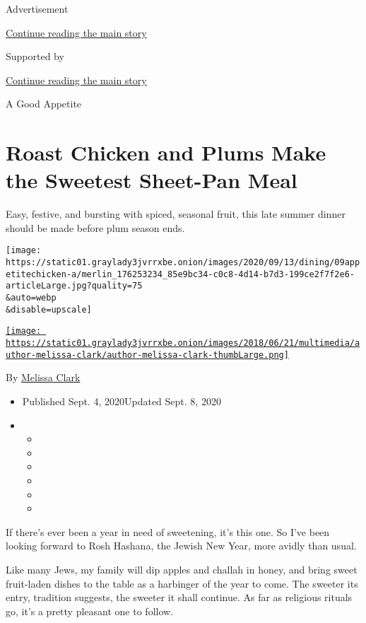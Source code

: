 Advertisement

\protect\hyperlink{after-top}{Continue reading the main story}

Supported by

\protect\hyperlink{after-sponsor}{Continue reading the main story}

A Good Appetite

\hypertarget{roast-chicken-and-plums-make-the-sweetest-sheet-pan-meal}{%
\section{Roast Chicken and Plums Make the Sweetest Sheet-Pan
Meal}\label{roast-chicken-and-plums-make-the-sweetest-sheet-pan-meal}}

Easy, festive, and bursting with spiced, seasonal fruit, this late
summer dinner should be made before plum season ends.

\texttt{[image: https://static01.graylady3jvrrxbe.onion/images/2020/09/13/dining/09appetitechicken-a/merlin\_176253234\_85e9bc34-c0c8-4d14-b7d3-199ce2f7f2e6-articleLarge.jpg?quality=75\\\&auto=webp\\\&disable=upscale]}

\href{https://www.nytimes3xbfgragh.onion/by/melissa-clark}{\texttt{[image: https://static01.graylady3jvrrxbe.onion/images/2018/06/21/multimedia/author-melissa-clark/author-melissa-clark-thumbLarge.png]}}

By \href{https://www.nytimes3xbfgragh.onion/by/melissa-clark}{Melissa
Clark}

\begin{itemize}
\item
  Published Sept. 4, 2020Updated Sept. 8, 2020
\item
  \begin{itemize}
  \item
  \item
  \item
  \item
  \item
  \item
  \end{itemize}
\end{itemize}

If there's ever been a year in need of sweetening, it's this one. So
I've been looking forward to Rosh Hashana, the Jewish New Year, more
avidly than usual.

Like many Jews, my family will dip apples and challah in honey, and
bring sweet fruit-laden dishes to the table as a harbinger of the year
to come. The sweeter its entry, tradition suggests, the sweeter it shall
continue. As far as religious rituals go, it's a pretty pleasant one to
follow.

